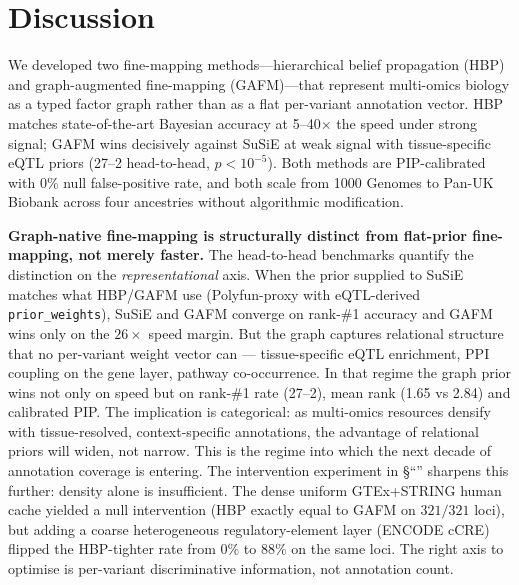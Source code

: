 \section*{Discussion}

We developed two fine-mapping methods---hierarchical belief
propagation (HBP) and graph-augmented
fine-mapping (GAFM)---that represent multi-omics biology as a typed factor
graph rather than as a flat per-variant annotation vector. HBP
matches state-of-the-art Bayesian accuracy at 5--40$\times$ the
speed under strong signal; GAFM wins decisively against SuSiE at
weak signal with tissue-specific eQTL priors (27--2 head-to-head,
$p < 10^{-5}$). Both methods are PIP-calibrated with 0\% null
false-positive rate, and both scale from 1000 Genomes to Pan-UK
Biobank across four ancestries without algorithmic modification.

\textbf{Graph-native fine-mapping is structurally distinct from
flat-prior fine-mapping, not merely faster.} The head-to-head
benchmarks quantify the distinction on the \emph{representational}
axis. When the prior supplied to SuSiE matches what HBP/GAFM use
(Polyfun-proxy with eQTL-derived \texttt{prior\_weights}), SuSiE
and GAFM converge on rank-\#1 accuracy and GAFM wins only on the
$26 \times$ speed margin. But the graph captures relational
structure that no per-variant weight vector can ---
tissue-specific eQTL enrichment, PPI coupling on the gene layer,
pathway co-occurrence. In that regime the graph prior wins not
only on speed but on rank-\#1 rate (27--2), mean rank (1.65 vs
2.84) and calibrated PIP. The implication is categorical: as
multi-omics resources densify with tissue-resolved, context-specific
annotations, the advantage of relational priors will widen, not
narrow. This is the regime into which the
next decade of annotation coverage is entering. The
intervention experiment in
\S``'' sharpens this further: density alone is
insufficient. The dense uniform GTEx+STRING human cache yielded a
null intervention (HBP exactly equal to GAFM on $321/321$ loci), but
adding a coarse heterogeneous regulatory-element layer
(ENCODE cCRE) flipped the HBP-tighter rate from $0\%$ to $88\%$
on the same loci. The right axis to optimise is per-variant
discriminative information, not annotation count.

